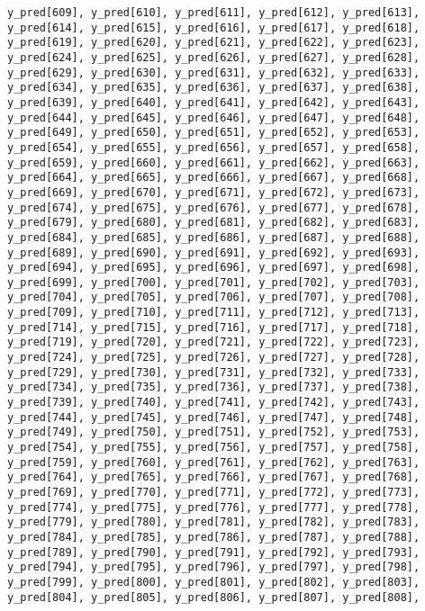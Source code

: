 \documentclass[
  letterpaper,
  DIV=11,
  numbers=noendperiod]{scrartcl}
\begin{document}
\begin{verbatim}
y_pred[609], y_pred[610], y_pred[611], y_pred[612], y_pred[613],
y_pred[614], y_pred[615], y_pred[616], y_pred[617], y_pred[618],
y_pred[619], y_pred[620], y_pred[621], y_pred[622], y_pred[623],
y_pred[624], y_pred[625], y_pred[626], y_pred[627], y_pred[628],
y_pred[629], y_pred[630], y_pred[631], y_pred[632], y_pred[633],
y_pred[634], y_pred[635], y_pred[636], y_pred[637], y_pred[638],
y_pred[639], y_pred[640], y_pred[641], y_pred[642], y_pred[643],
y_pred[644], y_pred[645], y_pred[646], y_pred[647], y_pred[648],
y_pred[649], y_pred[650], y_pred[651], y_pred[652], y_pred[653],
y_pred[654], y_pred[655], y_pred[656], y_pred[657], y_pred[658],
y_pred[659], y_pred[660], y_pred[661], y_pred[662], y_pred[663],
y_pred[664], y_pred[665], y_pred[666], y_pred[667], y_pred[668],
y_pred[669], y_pred[670], y_pred[671], y_pred[672], y_pred[673],
y_pred[674], y_pred[675], y_pred[676], y_pred[677], y_pred[678],
y_pred[679], y_pred[680], y_pred[681], y_pred[682], y_pred[683],
y_pred[684], y_pred[685], y_pred[686], y_pred[687], y_pred[688],
y_pred[689], y_pred[690], y_pred[691], y_pred[692], y_pred[693],
y_pred[694], y_pred[695], y_pred[696], y_pred[697], y_pred[698],
y_pred[699], y_pred[700], y_pred[701], y_pred[702], y_pred[703],
y_pred[704], y_pred[705], y_pred[706], y_pred[707], y_pred[708],
y_pred[709], y_pred[710], y_pred[711], y_pred[712], y_pred[713],
y_pred[714], y_pred[715], y_pred[716], y_pred[717], y_pred[718],
y_pred[719], y_pred[720], y_pred[721], y_pred[722], y_pred[723],
y_pred[724], y_pred[725], y_pred[726], y_pred[727], y_pred[728],
y_pred[729], y_pred[730], y_pred[731], y_pred[732], y_pred[733],
y_pred[734], y_pred[735], y_pred[736], y_pred[737], y_pred[738],
y_pred[739], y_pred[740], y_pred[741], y_pred[742], y_pred[743],
y_pred[744], y_pred[745], y_pred[746], y_pred[747], y_pred[748],
y_pred[749], y_pred[750], y_pred[751], y_pred[752], y_pred[753],
y_pred[754], y_pred[755], y_pred[756], y_pred[757], y_pred[758],
y_pred[759], y_pred[760], y_pred[761], y_pred[762], y_pred[763],
y_pred[764], y_pred[765], y_pred[766], y_pred[767], y_pred[768],
y_pred[769], y_pred[770], y_pred[771], y_pred[772], y_pred[773],
y_pred[774], y_pred[775], y_pred[776], y_pred[777], y_pred[778],
y_pred[779], y_pred[780], y_pred[781], y_pred[782], y_pred[783],
y_pred[784], y_pred[785], y_pred[786], y_pred[787], y_pred[788],
y_pred[789], y_pred[790], y_pred[791], y_pred[792], y_pred[793],
y_pred[794], y_pred[795], y_pred[796], y_pred[797], y_pred[798],
y_pred[799], y_pred[800], y_pred[801], y_pred[802], y_pred[803],
y_pred[804], y_pred[805], y_pred[806], y_pred[807], y_pred[808],

\end{verbatim}
\end{document}
